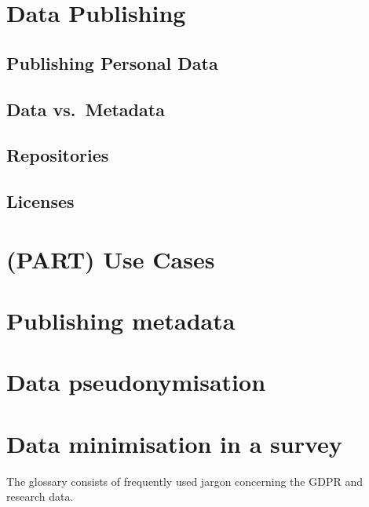 \documentclass[
]{book}
\begin{document}
\hypertarget{data-publishing}{%
\chapter{Data Publishing}\label{data-publishing}}

\hypertarget{publishing-personal-data}{%
\section{Publishing Personal Data}\label{publishing-personal-data}}

\hypertarget{data-vs.-metadata}{%
\section{Data vs.~Metadata}\label{data-vs.-metadata}}

\hypertarget{repositories}{%
\section{Repositories}\label{repositories}}

\hypertarget{licenses}{%
\section{Licenses}\label{licenses}}

\hypertarget{part-use-cases}{%
\chapter{(PART) Use Cases}\label{part-use-cases}}

\hypertarget{open-science-questionnaire}{%
\chapter{Publishing metadata}\label{open-science-questionnaire}}

\hypertarget{youth-pseudonymisation}{%
\chapter{Data pseudonymisation}\label{youth-pseudonymisation}}

\hypertarget{pet-survey}{%
\chapter{Data minimisation in a survey}\label{pet-survey}}

The glossary consists of frequently used jargon concerning the GDPR and research data.
\end{document}
